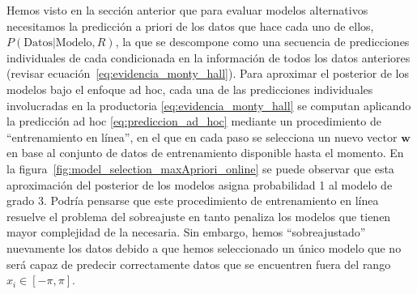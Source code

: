 \documentclass[a4paper,11pt]{book}
\theoremstyle{definition}
\begin{document}
Hemos visto en la secci\'on anterior que para evaluar modelos alternativos necesitamos la predicci\'on a priori de los datos que hace cada uno de ellos, $P(\text{Datos}|\text{Modelo}, R)$, la que se descompone como una secuencia de predicciones individuales de cada condicionada en la informaci\'on de todos los datos anteriores (revisar ecuaci\'on~\ref{eq:evidencia_monty_hall}).
%
Para aproximar el posterior de los modelos bajo el enfoque ad hoc, cada una de las predicciones individuales involucradas en la productoria \eqref{eq:evidencia_monty_hall} se computan aplicando la predicci\'on ad hoc \ref{eq:prediccion_ad_hoc} mediante un procedimiento de ``entrenamiento en l\'inea'', en el que en cada paso se selecciona un nuevo vector $\bm{w}$ en base al conjunto de datos de entrenamiento disponible hasta el momento.
%
En la figura~\ref{fig:model_selection_maxApriori_online} se puede observar que esta aproximaci\'on del posterior de los modelos asigna probabilidad 1 al modelo de grado 3.
%
Podr\'ia pensarse que este procedimiento de entrenamiento en l\'inea resuelve el problema del sobreajuste en tanto penaliza los modelos que tienen mayor complejidad de la necesaria.
%
Sin embargo, hemos ``sobreajustado'' nuevamente los datos debido a que hemos seleccionado un \'unico modelo que no ser\'a capaz de predecir correctamente datos que se encuentren fuera del rango $x_i \in [-\pi, \pi]$.
%
\end{document}
